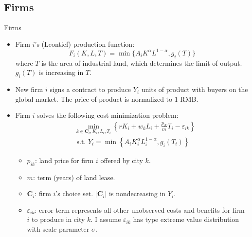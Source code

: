 \documentclass[xcolor={dvipsnames}]{beamer}
\theoremstyle{plain}
\newcommand{\RomanNumeralCaps}[1]{\MakeUppercase{\romannumeral #1}}
\begin{document}
\subsection{Firms}
\begin{frame}{Firms}
    \begin{itemize}
        \item Firm $i$'s (Leontief) production function:
              $$
                  F_{i}(K,L,T) = \min\{A_{i} K^{\alpha}L^{1-\alpha}, g_{i}(T)\}
              $$
              where $T$ is the area of industrial land, which determines the limit of output.
              $g_i(T)$ is increasing in $T$.
        \item New firm $i$ signs a contract to produce $Y_i$ units of product with buyers
              on the global market.
              The price of product is normalized to 1 RMB.
        \item Firm $i$ solves the following cost minimization problem:
              \begin{equation}
                  \begin{aligned}
                       & \min _{k \in \mathbf{C}_{i}, K_{i}, L_{i}, T_{i}}
                      \left\{r K_{i}+w_{k} L_{i}+\frac{p_{i k}}{m} T_{i}-\varepsilon_{i k}\right\}     \\
                       & \text { s.t. } Y_{i}=\min \left\{A_{i} K_{i}^{\alpha} L_{i}^{1-\alpha}, g_{i}
                      \left(T_{i}\right)\right\}
                  \end{aligned}
                  \label{firm_minimization1}
              \end{equation}
              \begin{itemize}
                  \item $p_{ik}$: land price for firm $i$ offered by city $k$.
                  \item $m$: term (years) of land lease.
                  \item $\mathbf{C}_i$: firm $i$'s choice set. $|\mathbf{C}_i|$ is
                        nondecreasing in $Y_i$.
                  \item $\varepsilon_{ik}$: error term represents all other unobserved costs
                        and benefits for firm $i$ to produce in city $k$.
                        I assume $\varepsilon_{ik}$ has type
                        \RomanNumeralCaps{1} extreme value distribution with scale parameter $\sigma$.
              \end{itemize}
    \end{itemize}
\end{frame}
\end{document}
